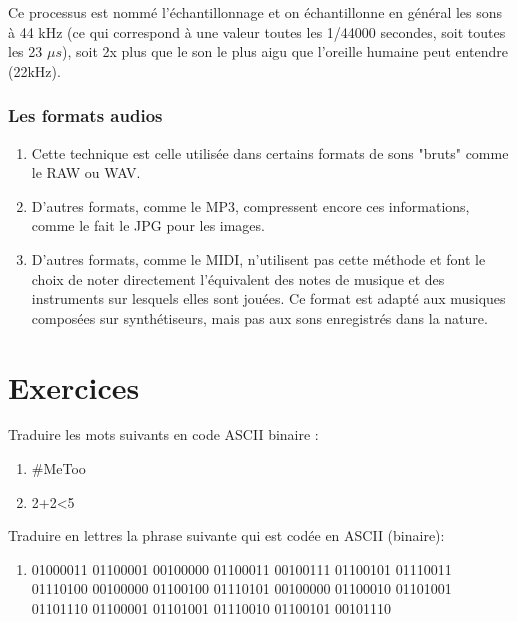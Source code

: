 \documentclass[11pt, a4paper]{book}
\begin{document}
Ce processus est nommé l'échantillonnage et on échantillonne en général les sons à 44 kHz (ce qui correspond à une valeur toutes les 1/44000 secondes, soit toutes les 23 $\mu s$), soit 2x plus que le son le plus aigu que l'oreille humaine peut entendre (22kHz).

\subsubsection{Les formats audios}
\begin{enumerate}
\item Cette technique est celle utilisée dans certains formats de sons "bruts" comme le RAW ou WAV. 

\item D'autres formats, comme le MP3, compressent encore ces informations, comme le fait le JPG pour les images.

\item D'autres formats, comme le MIDI, n'utilisent pas cette méthode et font le choix de noter directement l'équivalent des notes de musique et des instruments sur lesquels elles sont jouées. Ce format est adapté aux musiques composées sur synthétiseurs, mais pas aux sons enregistrés dans la nature.

\end{enumerate}

\section{Exercices}


\iffalse   %
\begin{exercice}
Traduire les mots suivants en code ASCII binaire :
\begin{enumerate}
\item \#MeToo
\item 2+2<5
\end{enumerate}
\end{exercice}

\begin{exercice}
Traduire en lettres la phrase suivante qui est codée en ASCII (binaire):
\begin{enumerate}
\item 01000011 01100001 00100000 01100011 00100111 01100101 01110011 01110100 00100000 01100100 01110101 00100000 01100010 01101001 01101110 01100001 01101001 01110010 01100101 00101110
\end{enumerate}
\end{exercice}
\end{document}
